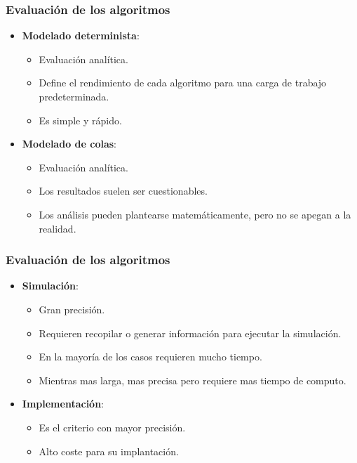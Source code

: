 \documentclass{beamer}
\begin{document}
\begin{frame}
\frametitle{Evaluación de los algoritmos}

\begin{itemize}
	\item \textbf{Modelado determinista}:
	\begin{itemize}
		\item Evaluación analítica.
		\item Define el rendimiento de cada algoritmo para una carga de trabajo predeterminada.
		\item Es simple y rápido.
	\end{itemize}
	\vspace{0.5cm}
	
	\item \textbf{Modelado de colas}:
	\begin{itemize}
		\item Evaluación analítica.
		\item Los resultados suelen ser cuestionables.
		\item Los análisis pueden plantearse matemáticamente, pero no se apegan a la realidad.
	\end{itemize}
\end{itemize}
\end{frame}

\begin{frame}
	\frametitle{Evaluación de los algoritmos}
	
	\begin{itemize}
		\item \textbf{Simulación}:
		\begin{itemize}
			\item Gran precisión.
			\item Requieren recopilar o generar información para ejecutar la simulación.
			\item En la mayoría de los casos requieren mucho tiempo.
			\item Mientras mas larga, mas precisa pero requiere mas tiempo de computo.
		\end{itemize}
		\vspace{0.5cm}
		
		\item \textbf{Implementación}:
		\begin{itemize}
			\item Es el criterio con mayor precisión.
			\item Alto coste para su implantación.
		\end{itemize}
	\end{itemize}
\end{frame}
\end{document}
